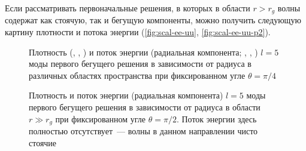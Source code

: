 \documentclass[\docroot/reports/draft/report.tex]{subfiles}
\begin{document}
        Если рассматривать первоначальные решения, в которых в области $r > r_g$ волны содержат как стоячую, так и бегущую компоненты, можно получить следующую картину плотности и потока энергии (\autoref{fig:scal-ee-uu}, \autoref{fig:scal-ee-uu-p2}).
        \begin{figure}[h]
            \centering
            \hspace{8pt}%
            \hspace{8pt}%
            \hspace{8pt}%
            \hspace{8pt}%
            \hspace{8pt}%
            \hspace{8pt}%
            \caption[]{Плотность (, , ) и поток энергии (радиальная компонента; , , ) $l=5$ моды первого бегущего решения в зависимости от радиуса в различных областях пространства при фиксированном угле $\theta = \pi/4$}%
            \label{fig:scal-ee-uu}%
        \end{figure}
        \begin{figure}[h]
            \centering
            \hspace{8pt}%
            \hspace{8pt}
            \caption[]{Плотность  и поток энергии (радиальная компонента)  $l=5$ моды первого бегущего решения в зависимости от радиуса в области $r \gg r_g$ при фиксированном угле $\theta = \pi/2$. Поток энергии здесь полностью отсутствует~--- волны в данном направлении чисто стоячие}%
            \label{fig:scal-ee-uu-p2}%
        \end{figure}
\end{document}
